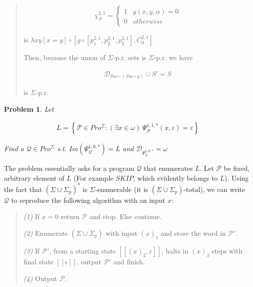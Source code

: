 \documentclass[a4paper, 12pt]{article}
\newtheorem{problem}{Problem}
\newtheorem{problem}{Problem}
\begin{document}
\begin{quote}
\begin{align*}
    \chi_{S'}^{2, 1} = \begin{cases}
        1 & g(x, y, \alpha) = 0 \\ 
        0 & otherwise
    \end{cases}
\end{align*}

is $\lambda xy \left[ x = y  \right] \circ \left[ g \circ \left[ p_1^{2, 1},
p_2^{2, 1}, p_3^{2, 1} \right], C_0^{2, 1}  \right] $

Then, because the union of $\Sigma$-p.r. sets is $\Sigma$-p.r. we have 

\begin{align*}
    \mathcal{D}_{Suc \circ (Suc \circ g)} \cup S' = S
\end{align*}

is $\Sigma$-p.r. 

\end{quote}
\normalsize

\pagebreak

\begin{problem}
    Let

    \begin{align*}
    L = \left\{ \mathcal{P} \in Pro^{\Sigma} : \left( \exists x \in \omega \right) ~
    \Psi_{\mathcal{P}}^{1, 1, *} (x, \varepsilon ) = \varepsilon \right\} 
    \end{align*}

    Find a $\mathcal{Q} \in Pro^{\Sigma}$ s.t. $Im(\Psi_{\mathcal{Q}}^{1, 0, *})
    = L$ and $\mathcal{D}_{\Psi_{\mathcal{Q}}^{1, 0, *}} = \omega$
\end{problem}

The problem essentially asks for a program $\mathcal{Q}$ that enumerates $L$.
Let $\mathcal{P}$ be fixed, arbitrary element of $L$ (For example $SKIP$,
 which
 evidently belongs to $L$). Using the fact that $(\Sigma \cup \Sigma_p)^{*}$ is
$\Sigma$-enumerable (it is $(\Sigma \cup \Sigma_p)$-total), we can write
$\mathcal{Q}$ to reproduce the following algorithm with an input $x$: 

\begin{quote}
    \textit{(1)} If $x = 0$ return $\mathcal{P}$ and stop. Else continue.

    \textit{(2)} Enumerate $(\Sigma \cup \Sigma_p)$ with input $(x)_1$ and store
    the word in $\mathcal{P'}$.

    \textit{(3)} If $\mathcal{P}'$, from a starting state $[\![ (x)_2,
    \varepsilon  ]\!]$, halts in $(x)_3$ steps with final state $[\![ \epsilon
    ]\!]$, output $\mathcal{P}'$ and finish. 

    \textit{(4)} Output $\mathcal{P}$.
\end{quote}
\end{document}
